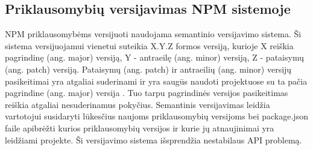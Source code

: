 \subsection{Priklausomybių versijavimas NPM sistemoje}

NPM priklausomybėms versijuoti naudojama semantinio versijavimo sistema. Ši sistema versijuojamui vienetui
suteikia X.Y.Z formos versiją, kurioje X reiškia pagrindinę (ang. major) versiją, Y - antraeilę (ang. minor) versiją,
Z - pataisymų (ang. patch) versiją. Pataisymų (ang. patch) ir antraeilių (ang. minor) versijų pasikeitimai yra atgaliai suderinami
ir yra saugūs naudoti projektuose su ta pačia pagrindine (ang. major) versija \cite{NPMb}.
Tuo tarpu pagrindinės versijos pasikeitimas reiškia atgaliai nesuderinamus pokyčius.
Semantinis versijavimas leidžia vartotojui susidaryti lūkesčius naujoms priklausomybių versijoms bei
package.json faile apibrėžti kurios priklausomybių versijos ir kurie jų atnaujinimai yra leidžiami projekte.
Ši versijavimo sistema išsprendžia nestabilaus API problemą. %


